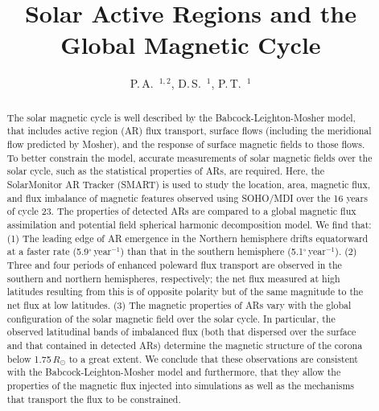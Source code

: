 \documentclass[namedreferences]{solarphysics}
\newcommand{\degr}{\ensuremath{^\circ}}
\begin{document}
\begin{article}

\begin{opening}

\title{Solar Active Regions and the Global Magnetic Cycle}

\author{P.\,A.~$^{1,2}$\sep
        D.\,S.~$^{1}$\sep
        P.\,T.~$^{1}$      
       }


\begin{abstract}
The solar magnetic cycle is well described by the Babcock-Leighton-Mosher model, that includes active region (AR) flux transport, surface flows (including the meridional flow predicted by Mosher), and the response of surface magnetic fields to those flows. To better constrain the model, accurate measurements of solar magnetic fields over the solar cycle, such as the statistical properties of ARs, are required. Here, the SolarMonitor AR Tracker (SMART) is used to study the location, area, magnetic flux, and flux imbalance of magnetic features observed using SOHO/MDI over the 16 years of cycle 23. The properties of detected ARs are compared to a global magnetic flux assimilation and potential field spherical harmonic decomposition model. We find that: (1) The leading edge of AR emergence in the Northern hemisphere drifts equatorward at a faster rate (5.9\degr\,year$^{-1}$) than that in the southern hemisphere (5.1\degr\,year$^{-1}$). (2) Three and four periods of enhanced poleward flux transport are observed in the southern and northern hemispheres, respectively; the net flux measured at high latitudes resulting from this is of opposite polarity but of the same magnitude to the net flux at low latitudes. (3) The magnetic properties of ARs vary with the global configuration of the solar magnetic field over the solar cycle. In particular, the observed latitudinal bands of imbalanced flux (both that dispersed over the surface and that contained in detected ARs) determine the magnetic structure of the corona below 1.75\,$R_{\odot}$ to a great extent. We conclude that these observations are consistent with the Babcock-Leighton-Mosher model and furthermore, that they allow the properties of the magnetic flux injected into simulations as well as the mechanisms that transport the flux to be constrained. 


\end{abstract}
\end{opening}
\end{article}
\end{document}
